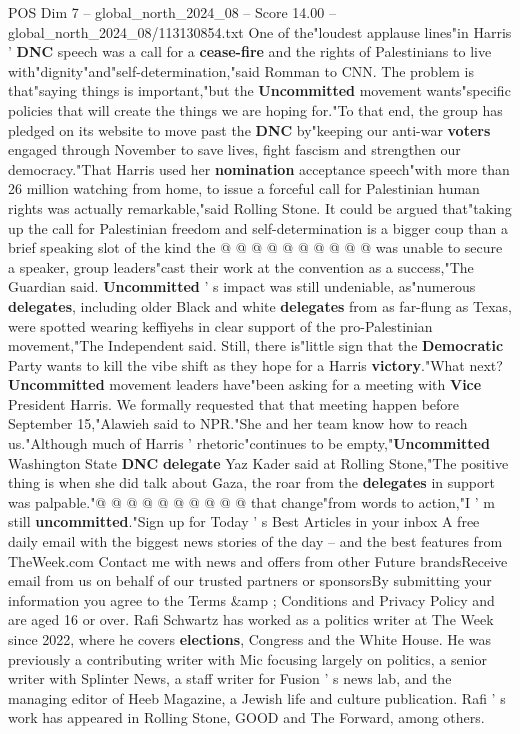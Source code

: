 \begin{textsample}{POS Dim 7 – global\_north\_2024\_08 – Score 14.00 – global\_north\_2024\_08/113130854.txt}
One of the"loudest applause lines"in Harris ' \textbf{DNC} speech was a call for a \textbf{cease-fire} and the rights of Palestinians to live with"dignity"and"self-determination,"said Romman to CNN.
The problem is that"saying things is important,"but the \textbf{Uncommitted} movement wants"specific policies that will create the things we are hoping for."To that end, the group has pledged on its website to move past the \textbf{DNC} by"keeping our anti-war \textbf{voters} engaged through November to save lives, fight fascism and strengthen our democracy."That Harris used her \textbf{nomination} acceptance speech"with more than 26 million watching from home, to issue a forceful call for Palestinian human rights was actually remarkable,"said Rolling Stone.
It could be argued that"taking up the call for Palestinian freedom and self-determination is a bigger coup than a brief speaking slot of the kind the @ @ @ @ @ @ @ @ @ @ was unable to secure a speaker, group leaders"cast their work at the convention as a success,"The Guardian said. \textbf{Uncommitted} ' s impact was still undeniable, as"numerous \textbf{delegates}, including older Black and white \textbf{delegates} from as far-flung as Texas, were spotted wearing keffiyehs in clear support of the pro-Palestinian movement,"The Independent said.
Still, there is"little sign that the \textbf{Democratic} Party wants to kill the vibe shift as they hope for a Harris \textbf{victory}."What next? \textbf{Uncommitted} movement leaders have"been asking for a meeting with \textbf{Vice} President Harris.
We formally requested that that meeting happen before September 15,"Alawieh said to NPR."She and her team know how to reach us."Although much of Harris ' rhetoric"continues to be empty,"\textbf{Uncommitted} Washington State \textbf{DNC} \textbf{delegate} Yaz Kader said at Rolling Stone,"The positive thing is when she did talk about Gaza, the roar from the \textbf{delegates} in support was palpable."@ @ @ @ @ @ @ @ @ @ that change"from words to action,"I ' m still \textbf{uncommitted}."Sign up for Today ' s Best Articles in your inbox A free daily email with the biggest news stories of the day -- and the best features from TheWeek.com Contact me with news and offers from other Future brandsReceive email from us on behalf of our trusted partners or sponsorsBy submitting your information you agree to the Terms \&amp ; Conditions and Privacy Policy and are aged 16 or over.
Rafi Schwartz has worked as a politics writer at The Week since 2022, where he covers \textbf{elections}, Congress and the White House.
He was previously a contributing writer with Mic focusing largely on politics, a senior writer with Splinter News, a staff writer for Fusion ' s news lab, and the managing editor of Heeb Magazine, a Jewish life and culture publication.
Rafi ' s work has appeared in Rolling Stone, GOOD and The Forward, among others.

\end{textsample}
